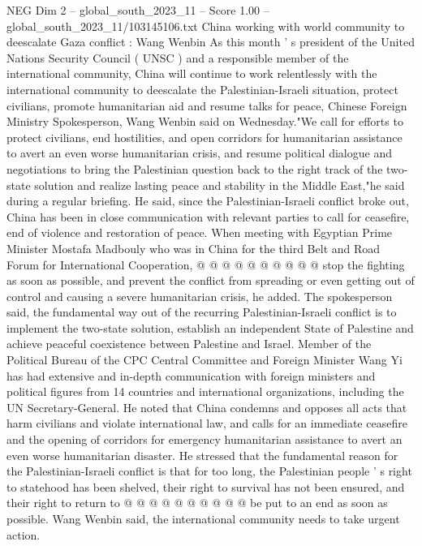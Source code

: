 \begin{textsample}{NEG Dim 2 – global\_south\_2023\_11 – Score 1.00 – global\_south\_2023\_11/103145106.txt}  \label{ex:f2_neg_227}
China working with world community to deescalate Gaza conflict : Wang Wenbin As this month ' s president of the United Nations Security Council ( UNSC ) and a responsible member of the international community, China will continue to work relentlessly with the international community to deescalate the Palestinian-Israeli situation, protect civilians, promote humanitarian aid and resume talks for peace, Chinese Foreign Ministry Spokesperson, Wang Wenbin said on Wednesday."We call for efforts to protect civilians, end hostilities, and open corridors for humanitarian assistance to avert an even worse humanitarian crisis, and resume political dialogue and negotiations to bring the Palestinian question back to the right track of the two-state solution and realize lasting peace and stability in the Middle East,"he said during a regular briefing.
He said, since the Palestinian-Israeli conflict broke out, China has been in close communication with relevant parties to call for ceasefire, end of violence and restoration of peace.
When meeting with Egyptian Prime Minister Mostafa Madbouly who was in China for the third Belt and Road Forum for International Cooperation, @ @ @ @ @ @ @ @ @ @ stop the fighting as soon as possible, and prevent the conflict from spreading or even getting out of control and causing a severe humanitarian crisis, he added.
The spokesperson said, the fundamental way out of the recurring Palestinian-Israeli conflict is to implement the two-state solution, establish an independent State of Palestine and achieve peaceful coexistence between Palestine and Israel.
Member of the Political Bureau of the CPC Central Committee and Foreign Minister Wang Yi has had extensive and in-depth communication with foreign ministers and political figures from 14 countries and international organizations, including the UN Secretary-General.
He noted that China condemns and opposes all acts that harm civilians and violate international law, and calls for an immediate ceasefire and the opening of corridors for emergency humanitarian assistance to avert an even worse humanitarian disaster.
He stressed that the fundamental reason for the Palestinian-Israeli conflict is that for too long, the Palestinian people ' s right to statehood has been shelved, their right to survival has not been ensured, and their right to return to @ @ @ @ @ @ @ @ @ @ be put to an end as soon as possible.
Wang Wenbin said, the international community needs to take urgent action.

\end{textsample}
